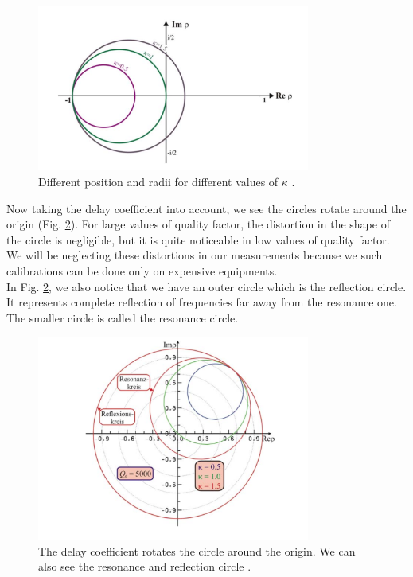 \documentclass[a4paper]{report}
\numberwithin{equation}{section}
\begin{document}
\begin{figure}[hbt!]
    \centering
    \includegraphics[width=0.8\textwidth]{circles}
	\caption{Different position and radii for different values of $\kappa$ \cite{Hillert}.}
    \label{fig:circles}
\end{figure}

Now taking the delay coefficient into account, we see the circles rotate around the origin (Fig. \ref{fig:delay}). For large values of quality factor, the distortion in the shape of the circle is negligible, but it is quite noticeable in low values of quality factor. We will be neglecting these distortions in our measurements because we such calibrations can be done only on expensive equipments. \\
In Fig. \ref{fig:delay}, we also notice that we have an outer circle which is the reflection circle. It represents complete reflection of frequencies far away from the resonance one. The smaller circle is called the resonance circle. 

\begin{figure}[hbt!]
    \centering
    \includegraphics[width=0.8\textwidth]{delay}
	\caption{The delay coefficient rotates the circle around the origin. We can also see the resonance and reflection circle \cite{Hillert}.}
    \label{fig:delay}
\end{figure}
\end{document}
